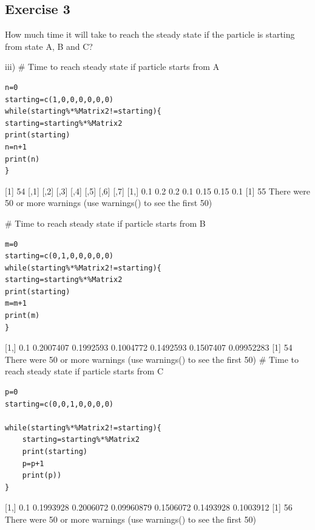 \documentclass[a4paper,12pt]{article}
\begin{document}
\newpage 
\subsection*{Exercise 3}

How much time it will take to reach the steady state if the particle is starting from state
A, B and C?



iii) # Time to reach steady state if particle starts from A

\begin{verbatim}
n=0
starting=c(1,0,0,0,0,0,0)
while(starting%*%Matrix2!=starting){
starting=starting%*%Matrix2
print(starting)
n=n+1
print(n)
}    
\end{verbatim}

[1] 54
[,1] [,2] [,3] [,4] [,5] [,6] [,7]
[1,] 0.1 0.2 0.2 0.1 0.15 0.15 0.1
[1] 55
There were 50 or more warnings (use warnings() to see the first 50)


# Time to reach steady state if particle starts from B

\begin{verbatim}
m=0
starting=c(0,1,0,0,0,0,0)
while(starting%*%Matrix2!=starting){
starting=starting%*%Matrix2
print(starting)
m=m+1
print(m)
}    
\end{verbatim}

[1,] 0.1 0.2007407 0.1992593 0.1004772 0.1492593 0.1507407 0.09952283
[1] 54
There were 50 or more warnings (use warnings() to see the first 50)
# Time to reach steady state if particle starts from C

\begin{framed}
\begin{verbatim}
p=0
starting=c(0,0,1,0,0,0,0)

while(starting%*%Matrix2!=starting){
    starting=starting%*%Matrix2
    print(starting)
    p=p+1
    print(p))
}    
\end{verbatim}
\end{framed}
[1,] 0.1 0.1993928 0.2006072 0.09960879 0.1506072 0.1493928 0.1003912
[1] 56
There were 50 or more warnings (use warnings() to see the first 50)
\end{document}
